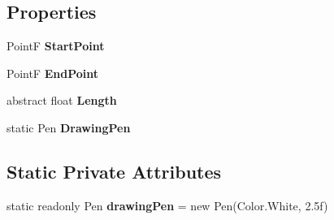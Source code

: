 \subsection*{Properties}
\begin{DoxyCompactItemize}
\item 
\hypertarget{class_robot_football_core_1_1_route_objects_1_1_route_segment_afb4b8744decb645a835e5b53c0614b55}{Point\-F {\bfseries Start\-Point}}\label{class_robot_football_core_1_1_route_objects_1_1_route_segment_afb4b8744decb645a835e5b53c0614b55}

\item 
\hypertarget{class_robot_football_core_1_1_route_objects_1_1_route_segment_a339535e81549f6a1d380e1051096a4ab}{Point\-F {\bfseries End\-Point}}\label{class_robot_football_core_1_1_route_objects_1_1_route_segment_a339535e81549f6a1d380e1051096a4ab}

\item 
\hypertarget{class_robot_football_core_1_1_route_objects_1_1_route_segment_a1088313d9245268bd23027cf35d76091}{abstract float {\bfseries Length}}\label{class_robot_football_core_1_1_route_objects_1_1_route_segment_a1088313d9245268bd23027cf35d76091}

\item 
\hypertarget{class_robot_football_core_1_1_route_objects_1_1_route_segment_a038fb2afe51442378d90d3fd216c9d30}{static Pen {\bfseries Drawing\-Pen}}\label{class_robot_football_core_1_1_route_objects_1_1_route_segment_a038fb2afe51442378d90d3fd216c9d30}

\end{DoxyCompactItemize}
\subsection*{Static Private Attributes}
\begin{DoxyCompactItemize}
\item 
\hypertarget{class_robot_football_core_1_1_route_objects_1_1_route_segment_af7a940db8d2aa3e6f02fa55bd0144482}{static readonly Pen {\bfseries drawing\-Pen} = new Pen(Color.\-White, 2.\-5f)}\label{class_robot_football_core_1_1_route_objects_1_1_route_segment_af7a940db8d2aa3e6f02fa55bd0144482}

\end{DoxyCompactItemize}


